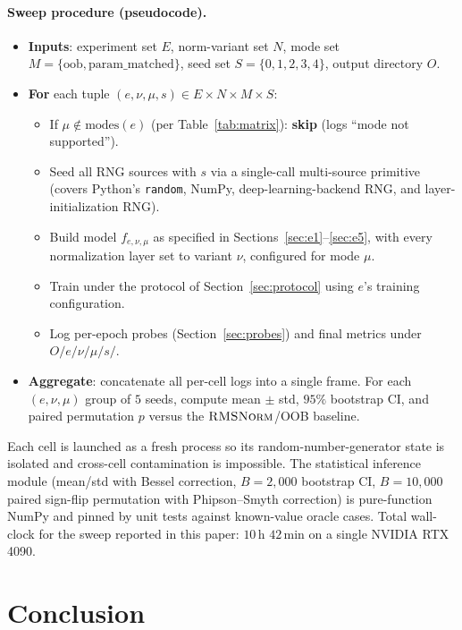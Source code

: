 \documentclass{article}
\newcommand{\rms}{\textsc{RMSNorm}}
\begin{document}
\paragraph{Sweep procedure (pseudocode).}
\begin{itemize}
\setlength{\itemsep}{0.2em}
  \item \textbf{Inputs}: experiment set $E$, norm-variant set $N$, mode set $M = \{\text{oob}, \text{param\_matched}\}$, seed set $S = \{0, 1, 2, 3, 4\}$, output directory $O$.
  \item \textbf{For} each tuple $(e, \nu, \mu, s) \in E \times N \times M \times S$:
  \begin{itemize}
    \item If $\mu \notin \text{modes}(e)$ (per Table~\ref{tab:matrix}): \textbf{skip} (logs ``mode not supported'').
    \item Seed all RNG sources with $s$ via a single-call multi-source primitive (covers Python's \texttt{random}, NumPy, deep-learning-backend RNG, and layer-initialization RNG).
    \item Build model $f_{e,\nu,\mu}$ as specified in Sections~\ref{sec:e1}--\ref{sec:e5}, with every normalization layer set to variant $\nu$, configured for mode $\mu$.
    \item Train under the protocol of Section~\ref{sec:protocol} using $e$'s training configuration.
    \item Log per-epoch probes (Section~\ref{sec:probes}) and final metrics under $O/e/\nu/\mu/s/$.
  \end{itemize}
  \item \textbf{Aggregate}: concatenate all per-cell logs into a single frame. For each $(e, \nu, \mu)$ group of $5$ seeds, compute mean $\pm$ std, $95\%$ bootstrap CI, and paired permutation $p$ versus the $\rms{}$/OOB baseline.
\end{itemize}

Each cell is launched as a fresh process so its random-number-generator state is isolated and cross-cell contamination is impossible.
The statistical inference module (mean/std with Bessel correction, $B = 2{,}000$ bootstrap CI, $B = 10{,}000$ paired sign-flip permutation with Phipson--Smyth correction) is pure-function NumPy and pinned by unit tests against known-value oracle cases.
Total wall-clock for the sweep reported in this paper: $10$\,h $42$\,min on a single NVIDIA RTX 4090.

\section{Conclusion}
\label{sec:conclusion}
\end{document}
